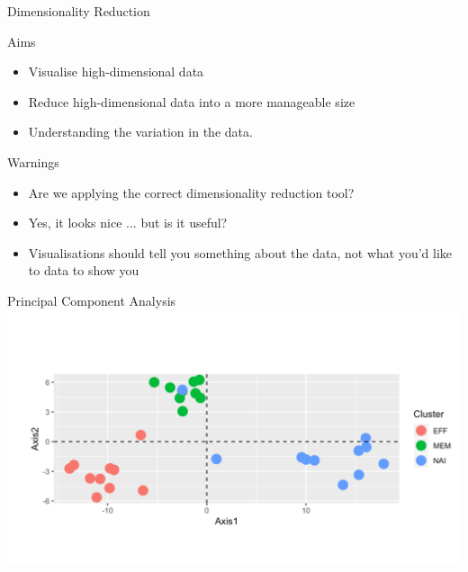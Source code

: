\documentclass{bredelebeamer}
\begin{document}
\begin{frame}{Dimensionality Reduction}
\begin{block}{Aims}
\begin{itemize}
\item Visualise high-dimensional data
\item Reduce high-dimensional data into a more manageable size
\item Understanding the variation in the data.
\end{itemize}
\end{block}

\begin{alertblock}{Warnings}
\begin{itemize}
\item Are we applying the correct dimensionality reduction tool?
\item Yes, it looks nice ... but is it useful?
\item Visualisations should tell you something about the data, not what you'd like to data to show you 
\end{itemize}
\end{alertblock}

\end{frame}

\begin{frame}{Principal Component Analysis}
\includegraphics[width=1\textwidth]{pcaplot}
\end{frame}
\end{document}
